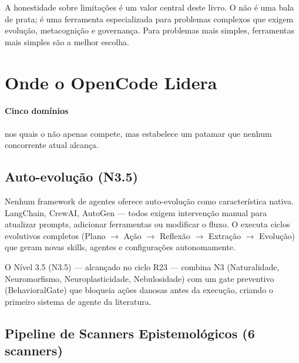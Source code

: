\begin{observacao}
A honestidade sobre limitações é um valor central deste livro. O
\opencodeeco{} não é uma bala de prata; é uma ferramenta especializada
para problemas complexos que exigem evolução, metacognição e governança.
Para problemas mais simples, ferramentas mais simples são a melhor
escolha.
\end{observacao}

\section{Onde o OpenCode Lidera}
\label{sec:lidera}
\nivelavancado

\paragraph{Cinco domínios} nos quais o \opencodeeco{} não apenas
compete, mas estabelece um patamar que nenhum concorrente atual alcança.

\subsection{Auto-evolução (N3.5)}

Nenhum framework de agentes oferece auto-evolução como característica
nativa. LangChain, CrewAI, AutoGen --- todos exigem intervenção manual
para atualizar prompts, adicionar ferramentas ou modificar o fluxo. O
\opencodeeco{} executa ciclos evolutivos completos (Plano $\rightarrow$
Ação $\rightarrow$ Reflexão $\rightarrow$ Extração $\rightarrow$
Evolução) que geram novas skills, agentes e configurações
autonomamente.

O Nível 3.5 (N3.5) --- alcançado no ciclo R23 --- combina N3
(Naturalidade, Neuromorfismo, Neuroplasticidade, Nebulosidade) com um
gate preventivo (BehavioralGate) que bloqueia ações danosas antes da
execução, criando o primeiro sistema de agente  da literatura.

\subsection{Pipeline de Scanners Epistemológicos (6 scanners)}

